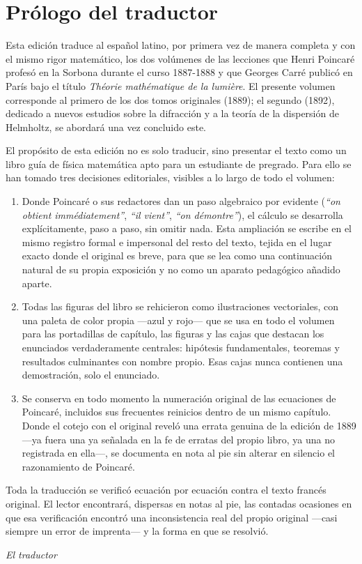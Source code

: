 \chapter*{Prólogo del traductor}

Esta edición traduce al español latino, por primera vez de manera completa
y con el mismo rigor matemático, los dos volúmenes de las lecciones que
Henri Poincaré profesó en la Sorbona durante el curso 1887-1888 y que
Georges Carré publicó en París bajo el título \emph{Théorie mathématique
de la lumière}. El presente volumen corresponde al primero de los dos
tomos originales (1889); el segundo (1892), dedicado a nuevos estudios
sobre la difracción y a la teoría de la dispersión de Helmholtz, se
abordará una vez concluido este.

El propósito de esta edición no es solo traducir, sino presentar el texto
como un libro guía de física matemática apto para un estudiante de
pregrado. Para ello se han tomado tres decisiones editoriales, visibles a
lo largo de todo el volumen:

\begin{enumerate}
  \item Donde Poincaré o sus redactores dan un paso algebraico por evidente
  (\emph{``on obtient immédiatement''}, \emph{``il vient''}, \emph{``on
  démontre''}), el cálculo se desarrolla explícitamente, paso a paso, sin
  omitir nada. Esta ampliación se escribe en el mismo registro formal e
  impersonal del resto del texto, tejida en el lugar exacto donde el
  original es breve, para que se lea como una continuación natural de su
  propia exposición y no como un aparato pedagógico añadido aparte.
  \item Todas las figuras del libro se rehicieron como ilustraciones
  vectoriales, con una paleta de color propia —azul y rojo— que se usa en
  todo el volumen para las portadillas de capítulo, las figuras y las
  cajas que destacan los enunciados verdaderamente centrales: hipótesis
  fundamentales, teoremas y resultados culminantes con nombre propio. Esas
  cajas nunca contienen una demostración, solo el enunciado.
  \item Se conserva en todo momento la numeración original de las
  ecuaciones de Poincaré, incluidos sus frecuentes reinicios dentro de un
  mismo capítulo. Donde el cotejo con el original reveló una errata
  genuina de la edición de 1889 —ya fuera una ya señalada en la fe de
  erratas del propio libro, ya una no registrada en ella—, se documenta en
  nota al pie sin alterar en silencio el razonamiento de Poincaré.
\end{enumerate}

Toda la traducción se verificó ecuación por ecuación contra el texto
francés original. El lector encontrará, dispersas en notas al pie, las
contadas ocasiones en que esa verificación encontró una inconsistencia
real del propio original —casi siempre un error de imprenta— y la forma en
que se resolvió.

\bigskip
\noindent\textit{El traductor}
